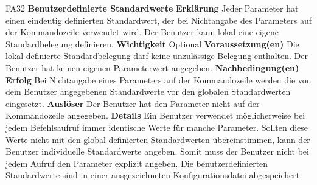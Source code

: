 \documentclass[a4paper,12pt]{article}
\begin{document}
\begin{itemize}[nosep]
\begin{minipage}[t]{\linewidth}
\item[FA32] \textbf{Benutzerdefinierte Standardwerte}
\subitem \textbf{Erklärung} Jeder Parameter hat einen eindeutig definierten Standardwert, der bei Nichtangabe des Parameters auf der Kommandozeile verwendet wird. Der \gls{Benutzer} kann lokal eine eigene Standardbelegung definieren.
\subitem \textbf{Wichtigkeit} Optional
\subitem \textbf{Voraussetzung(en)} Die lokal definierte Standardbelegung darf keine unzulässige Belegung enthalten.\newline
Der Benutzer hat keinen eigenen Parameterwert angegeben.
\subitem \textbf{Nachbedingung(en)}
\subsubitem \textbf{Erfolg} Bei Nichtangabe eines Parameters auf der Kommandozeile werden die von dem \gls{Benutzer} angegebenen Standardwerte vor den globalen Standardwerten eingesetzt.
\subitem \textbf{Auslöser} Der \gls{Benutzer} hat den Parameter nicht auf der Kommandozeile angegeben.
\subitem \textbf{Details} Ein \gls{Benutzer} verwendet möglicherweise bei jedem Befehlsaufruf immer identische Werte für manche Parameter. Sollten diese Werte nicht mit den global definierten Standardwerten übereinstimmen, kann der \gls{Benutzer} individuelle Standardwerte angeben. Somit muss der \gls{Benutzer} nicht bei jedem Aufruf den Parameter explizit angeben.\newline
Die benutzerdefinierten Standardwerte sind in einer ausgezeichneten Konfigurationsdatei abgespeichert.
\end{minipage}
\pagebreak


\end{itemize}
\end{document}
